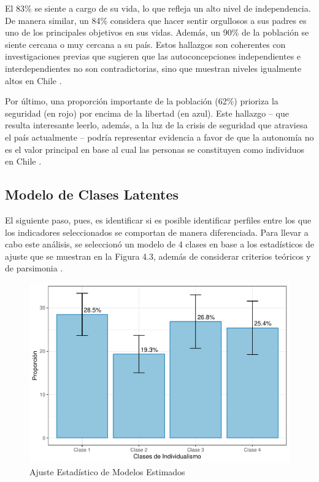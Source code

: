 \documentclass[12pt,twoside]{templates/facsothesis}
\begin{document}
El 83\% se siente a cargo de su vida, lo que refleja un alto nivel de independencia. De manera similar, un 84\% considera que hacer sentir orgullosos a sus padres es uno de los principales objetivos en sus vidas. Además, un 90\% de la población se siente cercana o muy cercana a su país. Estos hallazgos son coherentes con investigaciones previas que sugieren que las autoconcepciones independientes e interdependientes no son contradictorias, sino que muestran niveles igualmente altos en Chile \citep{benavides2020, kolstad2009}.

Por último, una proporción importante de la población (62\%) prioriza la seguridad (en rojo) por encima de la libertad (en azul). Este hallazgo -- que resulta interesante leerlo, además, a la luz de la crisis de seguridad que atraviesa el país actualmente -- podría representar evidencia a favor de que la autonomía no es el valor principal en base al cual las personas se constituyen como individuos en Chile \citep{martuccelli2010}.

\hypertarget{modelo-de-clases-latentes}{%
\subsection*{Modelo de Clases Latentes}\label{modelo-de-clases-latentes}}

El siguiente paso, pues, es identificar si es posible identificar perfiles entre los que los indicadores seleccionados se comportan de manera diferenciada. Para llevar a cabo este análisis, se seleccionó un modelo de 4 clases en base a los estadísticos de ajuste que se muestran en la Figura 4.3, además de considerar criterios teóricos y de parsimonia \citep{collins2010}.

\begin{figure}[!ht]

{\centering \includegraphics[width=1\linewidth,]{tesis_files/figure-latex/unnamed-chunk-11-1} 

}

\caption{Ajuste Estadístico de Modelos Estimados}\label{fig:unnamed-chunk-11}
\end{figure}
\FloatBarrier
\end{document}
